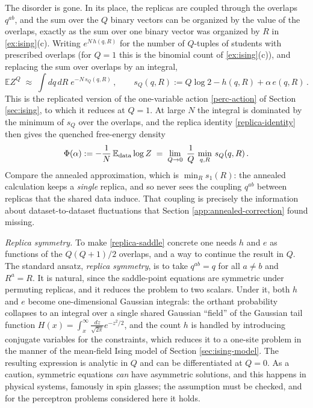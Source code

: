 \documentclass[11pt]{article}
\newcommand{\E}{\mathbb{E}}
\begin{document}
The disorder is gone. In its place, the replicas are coupled through the overlaps $q^{ab}$, and the sum over the $Q$ binary vectors can be organized by the value of the overlaps, exactly as the sum over one binary vector was organized by $R$ in \cref{ex:ising}(c). Writing $e^{N\,h(q,R)}$ for the number of $Q$-tuples of students with prescribed overlaps (for $Q=1$ this is the binomial count of \cref{ex:ising}(c)), and replacing the sum over overlaps by an integral,
%
\begin{equation}
    \E Z^Q \;\approx\; \int dq\,dR\; e^{-N\,s_Q(q,R)}\,,\qquad s_Q(q,R) := Q\log 2 - h(q,R) + \alpha\,e(q,R)\,. \label{replica-action}
\end{equation}
%
This is the replicated version of the one-variable action \eqref{perc-action} of Section \ref{sec:ising}, to which it reduces at $Q=1$. At large $N$ the integral is dominated by the minimum of $s_Q$ over the overlaps, and the replica identity \eqref{replica-identity} then gives the quenched free-energy density
%
\begin{equation}
    \Phi(\alpha) := -\frac{1}{N}\,\E_{\rm data}\log Z \;=\; \lim_{Q\to0}\;\frac{1}{Q}\,\min_{q,R}\,s_Q(q,R)\,. \label{replica-saddle}
\end{equation}
%
Compare the annealed approximation, which is $\min_R s_1(R)$: the annealed calculation keeps a \emph{single} replica, and so never sees the coupling $q^{ab}$ between replicas that the shared data induce. That coupling is precisely the information about dataset-to-dataset fluctuations that Section \ref{app:annealed-correction} found missing.

\emph{Replica symmetry.} To make \eqref{replica-saddle} concrete one needs $h$ and $e$ as functions of the $Q(Q+1)/2$ overlaps, and a way to continue the result in $Q$. The standard ansatz, \emph{replica symmetry}, is to take $q^{ab} = q$ for all $a\neq b$ and $R^a = R$. It is natural, since the saddle-point equations are symmetric under permuting replicas, and it reduces the problem to two scalars. Under it, both $h$ and $e$ become one-dimensional Gaussian integrals: the orthant probability collapses to an integral over a single shared Gaussian ``field'' of the Gaussian tail function $H(x) = \int_x^\infty\frac{dz}{\sqrt{2\pi}}e^{-z^2/2}$, and the count $h$ is handled by introducing conjugate variables for the constraints, which reduces it to a one-site problem in the manner of the mean-field Ising model of Section \ref{sec:ising-model}. The resulting expression is analytic in $Q$ and can be differentiated at $Q=0$. As a caution, symmetric equations \emph{can} have asymmetric solutions, and this happens in physical systems, famously in spin glasses; the assumption must be checked, and for the perceptron problems considered here it holds.
\end{document}
